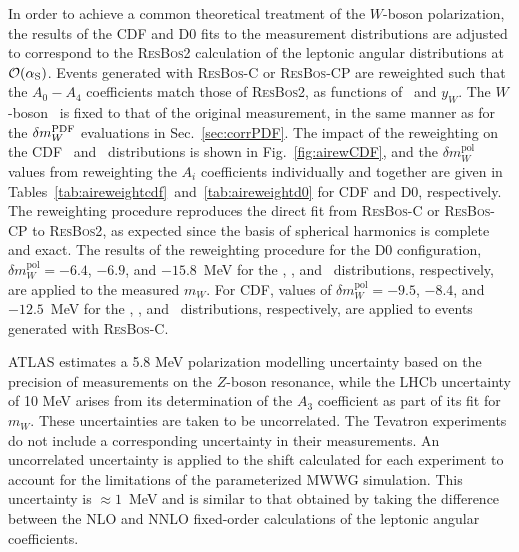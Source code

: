 In order to achieve a common theoretical treatment of the $W$-boson polarization, the results of the CDF and 
D0 fits to the measurement distributions are adjusted to correspond to the \textsc{ResBos2} calculation of the 
leptonic angular distributions at ${\cal O}(\alpha_{\mathrm{S}})$.  Events generated with \textsc{ResBos-C} or
\textsc{ResBos-CP} 
are reweighted such that the $A_0-A_4$ coefficients match those of \textsc{ResBos2}, as functions of \pTW~and 
$y_W$.  The $W$-boson \pT~is fixed to that of the original measurement, in the same manner as for the 
$\delta m_W^{\scriptsize\textrm{PDF}}$ evaluations in Sec.~\ref{sec:corrPDF}.  The impact of the reweighting on
the CDF \mT~and \pTl~distributions is shown in Fig.~\ref{fig:airewCDF}, and the $\delta m_W^{\mathrm{pol}}$
values from reweighting
the $A_i$ coefficients individually and together are given in Tables~\ref{tab:aireweightcdf}~and~\ref{tab:aireweightd0}
for CDF and D0, respectively.  The reweighting procedure reproduces the direct fit from \textsc{ResBos-C} or
\textsc{ResBos-CP} to \textsc{ResBos2}, as expected since the basis of spherical harmonics is complete and exact.
The results of the reweighting procedure for the D0 
configuration, $\delta m_W^{\mathrm{pol}} = -6.4$, $-6.9$, and $-15.8$~MeV for the \mT, \pTl, and
\met~distributions, respectively, are applied to the measured $m_W$.  For CDF, values of
$\delta m_W^{\mathrm{pol}} = -9.5$, $-8.4$, and $-12.5$~MeV for the \mT, \pTl, and
\met~distributions, respectively, are applied to events generated with \textsc{ResBos-C}.

ATLAS estimates a 5.8 MeV polarization modelling uncertainty based on the precision of measurements on the 
$Z$-boson resonance, while the LHCb uncertainty of 10 MeV arises from its determination of the $A_3$ 
coefficient as part of its fit for $m_W$.  These uncertainties are taken to be uncorrelated.  The Tevatron 
experiments do not include a corresponding uncertainty in their measurements.  An uncorrelated uncertainty 
is applied to the shift calculated for each experiment to account for the limitations of the parameterized MWWG
simulation.  This uncertainty is $\approx 1$~MeV and is similar to that obtained by taking the difference between
the NLO and NNLO fixed-order calculations of the leptonic angular coefficients.

